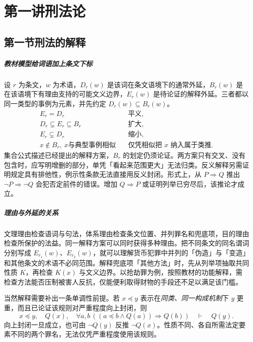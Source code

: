 \chapter{第一讲\quad 刑法论}
\label{lecture:01}
\par

\section{第一节\quad 刑法的解释}

\paragraph{教材模型\quad 给词语加上条文下标}
设 \(r\) 为条文，\(w\) 为术语，\(D_r(w)\) 是该词在条文语境下的通常外延，\(B_r(w)\) 是在该语境下有理由支持的可能文义边界，\(E_r(w)\) 是待论证的解释外延。三者都以同一类型的事例为元素，并先约定 \(D_r(w)\subseteq B_r(w)\)。
\begin{align*}
 E_r=D_r &\quad \text{平义},\\
 D_r\subsetneq E_r\subseteq B_r &\quad \text{扩大},\\
 E_r\subsetneq D_r &\quad \text{缩小},\\
 x\notin B_r,\ x\text{与典型事例相似}
 &\quad \text{仅凭相似把 }x\text{ 纳入属于类推}.
\end{align*}
集合公式描述已经提出的解释方案，\(B_r\) 的划定仍须论证。两方案只有交叉、没有包含时，应写明增删的部分，单凭「看起来范围更大」无法归类。反义解释另需证明规定具有排他性，例示性条款无法直接用反义封闭。形式上，从 \(P\Rightarrow Q\) 推出 \(\neg P\Rightarrow\neg Q\) 会犯否定前件的错误。增加 \(Q\Rightarrow P\) 或证明列举已穷尽后，该推论才成立。

\paragraph{理由与外延的关系}
文理理由检查语词与句法，体系理由检查条文位置、并列罪名和兜底项，目的理由检查所保护的法益。同一解释方案可以同时获得多种理由。把不同条文的同名谓词分别写成 \(E_{r_1}(w)\)、\(E_{r_2}(w)\)，就可以理解货币犯罪中并列的「伪造」与「变造」和其他条文的术语不必同范围。解释兜底项「其他方法」时，先从列举项抽取共同性质 \(K\)，再检查 \(K(x)\) 与文义边界。以抢劫罪为例，按照教材的功能解释，需检查方法能否压制被害人反抗，仅能便利取得财物的手段还不足以满足该门槛。

当然解释需要补出一条单调性前提。若 \(x\preceq y\) 表示在\emph{同类、同一构成机制}下 \(y\) 更重，而且已论证该规则对严重程度向上封闭，则
\[
 x\preceq y,\quad Q(x),\quad
 \forall a,b\,((a\preceq b\land Q(a))\Rightarrow Q(b))
 \quad\vdash\quad Q(y).
\]
向上封闭一旦成立，也可由 \(\neg Q(y)\) 反推 \(\neg Q(x)\)。性质不同、各自所需法定要素不同的两个罪名，无法仅凭严重程度使用该规则。

